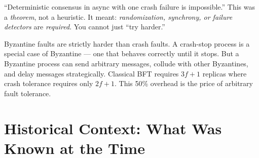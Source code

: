 ``Deterministic consensus in async with one crash failure is impossible.'' This was a \emph{theorem}, not a heuristic. It meant: \emph{randomization, synchrony, or failure detectors} are \emph{required}. You cannot just ``try harder.''

Byzantine faults are strictly harder than crash faults. A crash-stop process is a special case of Byzantine — one that behaves correctly until it stops. But a Byzantine process can send arbitrary messages, collude with other Byzantines, and delay messages strategically. Classical BFT requires $3f+1$ replicas where crash tolerance requires only $2f+1$. This 50\% overhead is the price of arbitrary fault tolerance.

\section{Historical Context: What Was Known at the Time}
\label{sec:consensus:context}

